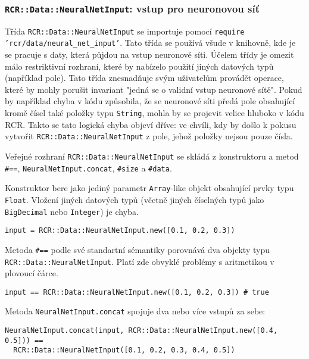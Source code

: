 \documentclass[a4paper]{article}
\begin{document}
\subsubsection{\texttt{RCR::Data::NeuralNetInput}: vstup pro neuronovou síť}
Třída \texttt{RCR::Data::NeuralNetInput} se importuje pomocí \texttt{require
'rcr/data/neural\_net\_input'}. Tato třída se používá všude v knihovně, kde
je se pracuje s daty, která půjdou na vstup neuronové síti. Účelem třídy
je omezit málo restriktivní rozhraní, které by nabízelo použití jiných datových
typů (například pole). Tato třída znesnadňuje svým uživatelům provádět operace,
které by mohly porušit invariant "jedná se o validní vstup neuronové sítě".
Pokud by například chyba v kódu způsobila, že se neuronové síti předá pole
obsahující kromě čísel také položky typu \texttt{String}, mohla by se projevit
velice hluboko v kódu RCR. Takto se tato logická chyba objeví dříve: ve chvíli,
kdy by došlo k pokusu vytvořit \texttt{RCR::Data::NeuralNetInput} z pole,
jehož položky nejsou pouze čísla.

Veřejné rozhraní \texttt{RCR::Data::NeuralNetInput} se skládá z konstruktoru a
metod \texttt{\#==}, \texttt{NeuralNetInput.concat}, \texttt{\#size} a \texttt{\#data}.

Konstruktor bere jako jediný parametr \texttt{Array}-like objekt obsahující
prvky typu \texttt{Float}. Vložení jiných datových typů (včetně jiných číselných
typů jako \texttt{BigDecimal} nebo \texttt{Integer}) je chyba.
\begin{lstlisting}
input = RCR::Data::NeuralNetInput.new([0.1, 0.2, 0.3])
\end{lstlisting}

Metoda \texttt{\#==} podle své standartní sémantiky porovnává dva objekty typu
\texttt{RCR::Data::NeuralNetInput}. Platí zde obvyklé problémy s aritmetikou
v plovoucí čárce.
\begin{lstlisting}
input == RCR::Data::NeuralNetInput.new([0.1, 0.2, 0.3]) # true
\end{lstlisting}

Metoda \texttt{NeuralNetInput.concat} spojuje dva nebo více vstupů za sebe:
\begin{lstlisting}
NeuralNetInput.concat(input, RCR::Data::NeuralNetInput.new([0.4, 0.5])) ==
  RCR::Data::NeuralNetInput([0.1, 0.2, 0.3, 0.4, 0.5])
\end{lstlisting}

\end{document}
